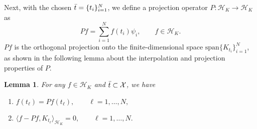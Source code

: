 \documentclass{article}
\numberwithin{equation}{section}
\newtheorem{lemma}[theorem]{Lemma}
\begin{document}
Next, with the chosen $\Bar{t}=\{t_i\}_{i=1}^N$, we define a projection operator $P: \mathcal{H}_K \rightarrow \mathcal{H}_K$ as 
\begin{equation}
   Pf = \sum_{i=1}^N f(t_i)\psi_i, \qquad f\in \mathcal{H}_K. 
\end{equation}
 $Pf$ is the orthogonal projection onto the finite-dimensional space $\text{span}\{K_{t_i}\}_{i=1}^N$, as shown in the following lemma about the interpolation and projection properties of $P$. 
\begin{lemma}\label{lemma:ortho}
    For any $f \in \mathcal{H}_K$ and $\Bar{t} \subset \mathcal{X}$, we have
\begin{enumerate}
    \item $f(t_\ell) = Pf(t_\ell), \qquad \ell = 1,\ldots, N,$ \label{item1}
    \item $\langle f -Pf, K_{t_\ell}\rangle_{\mathcal{H}_K} = 0, \qquad \ell = 1,\ldots, N.$ \label{item2}
\end{enumerate}
\end{lemma}
\end{document}
